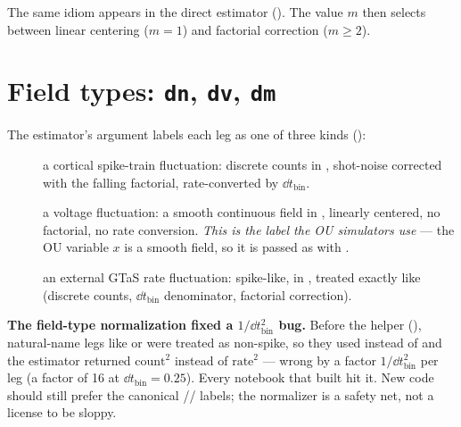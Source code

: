 The same idiom appears in the direct estimator ().
The value $m$ then selects between linear centering ($m=1$) and factorial
correction ($m \ge 2$).

\section{Field types: \texttt{dn}, \texttt{dv}, \texttt{dm}}
\label{sec:fieldtypes}

The estimator's  argument labels each leg as one of three kinds
():

\begin{description}
  \item[] a cortical spike-train fluctuation: discrete counts in
        , shot-noise corrected with the falling factorial,
        rate-converted by $\dd t_{\mathrm{bin}}$.
  \item[] a voltage fluctuation: a smooth continuous field in
        , linearly centered, no factorial, no rate conversion.
        \emph{This is the label the OU simulators use} --- the OU variable $x$ is a
        smooth field, so it is passed as  with
        .
  \item[] an external GTaS rate fluctuation: spike-like, in
        , treated exactly like  (discrete
        counts, $\dd t_{\mathrm{bin}}$ denominator, factorial correction).
\end{description}

\begin{gotcha}
\textbf{The field-type normalization fixed a $1/\dd t_{\mathrm{bin}}^{2}$ bug.}
Before the  helper (),
natural-name legs like  or  were treated as non-spike, so they
used  instead of  and the estimator returned
$\text{count}^{2}$ instead of $\text{rate}^{2}$ --- wrong by a factor
$1/\dd t_{\mathrm{bin}}^{2}$ per leg (a factor of 16 at $\dd t_{\mathrm{bin}} =
0.25$). Every notebook that built  hit it. New code should still prefer the canonical
// labels; the normalizer is a safety net, not a
license to be sloppy.
\end{gotcha}


